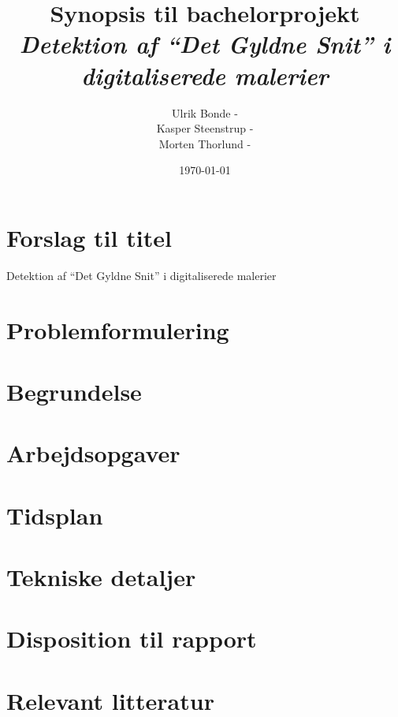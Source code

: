 \documentclass[a4paper, 10pt, danish, final]{article}
\title{{\Large Synopsis til bachelorprojekt}\\\emph{Detektion af ``Det Gyldne Snit'' i digitaliserede malerier}}
\author{Ulrik Bonde - \mailto{bonde@diku.dk}\\
Kasper Steenstrup - \mailto{khsj@diku.dk}\\
Morten Thorlund - \mailto{thorlund@diku.dk}}
\date{\today}
\begin{document}
\maketitle
\thispagestyle{empty}




\section*{Forslag til titel}
Detektion af ``Det Gyldne Snit'' i digitaliserede malerier

\section*{Problemformulering}


\section*{Begrundelse}


\section*{Arbejdsopgaver}


\section*{Tidsplan}


\section*{Tekniske detaljer}


\section*{Disposition til rapport}


\section*{Relevant litteratur}


\end{document}
